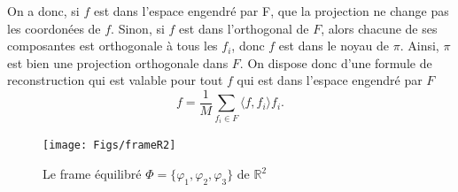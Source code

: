 On a donc, si $f$ est dans l'espace engendré par F, que la projection ne change pas les coordonées de $f$. Sinon, si $f$ est dans l'orthogonal de $F$, alors chacune de ses composantes est orthogonale à tous les $f_i$, donc $f$ est dans le noyau de $\pi$.
Ainsi, $\pi$ est bien une projection orthogonale dans $F$.
\newline
On dispose donc d'une formule de reconstruction qui est valable pour tout $f$ qui est dans l'espace engendré par $F$ 
\begin{equation}
	f = \frac{1}{M} \sum_{f_i \in F} \langle f, f_i \rangle f_i .
\end{equation}
\begin{figure}
	\centering
	\texttt{[image: Figs/frameR2]}
	\caption{Le frame équilibré $\Phi=\{\varphi_1, \varphi_2, \varphi_3\}$ de $\mathbb{R}^2$}
	\label{fig:frameR2}	
\end{figure}
	
